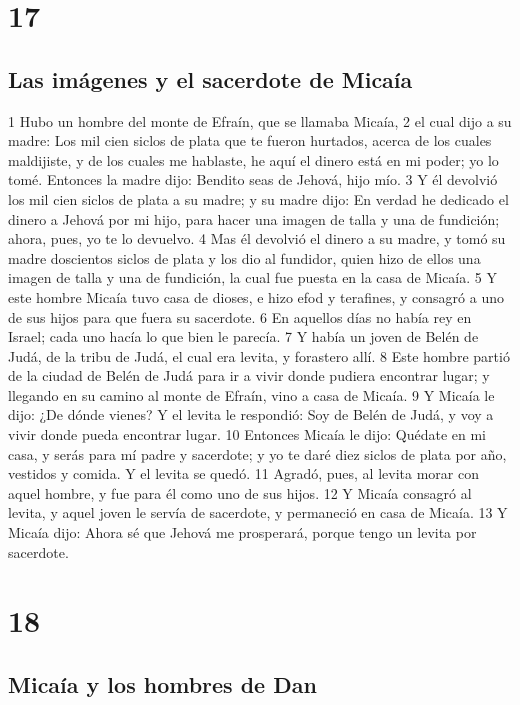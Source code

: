 \chapter{17}

\section*{Las imágenes y el sacerdote de Micaía}

1 Hubo un hombre del monte de Efraín, que se llamaba Micaía,
2 el cual dijo a su madre: Los mil cien siclos de plata   que te fueron hurtados, acerca de los cuales maldijiste, y de los cuales me hablaste, he aquí el dinero está en mi poder; yo lo tomé. Entonces la madre dijo: Bendito seas de Jehová, hijo mío.
3 Y él devolvió los mil cien siclos de plata   a su madre; y su madre dijo: En verdad he dedicado el dinero a Jehová por mi hijo, para hacer una imagen de talla y una de fundición; ahora, pues, yo te lo devuelvo.
4 Mas él devolvió el dinero a su madre, y tomó su madre doscientos siclos de plata   y los dio al fundidor, quien hizo de ellos una imagen de talla y una de fundición, la cual fue puesta en la casa de Micaía.
5 Y este hombre Micaía tuvo casa de dioses, e hizo efod y terafines, y consagró a uno de sus hijos para que fuera su sacerdote.
6 En aquellos días no había rey en Israel; cada uno hacía lo que bien le parecía. 
7 Y había un joven de Belén de Judá, de la tribu de Judá, el cual era levita, y forastero allí.
8 Este hombre partió de la ciudad de Belén de Judá para ir a vivir donde pudiera encontrar lugar; y llegando en su camino al monte de Efraín, vino a casa de Micaía.
9 Y Micaía le dijo: ¿De dónde vienes? Y el levita le respondió: Soy de Belén de Judá, y voy a vivir donde pueda encontrar lugar.
10 Entonces Micaía le dijo: Quédate en mi casa, y serás para mí padre y sacerdote; y yo te daré diez siclos de plata   por año, vestidos y comida. Y el levita se quedó. 
11 Agradó, pues, al levita morar con aquel hombre, y fue para él como uno de sus hijos.
12 Y Micaía consagró al levita, y aquel joven le servía de sacerdote, y permaneció en casa de Micaía.
13 Y Micaía dijo: Ahora sé que Jehová me prosperará, porque tengo un levita por sacerdote.

\chapter{18}

\section*{Micaía y los hombres de Dan}

